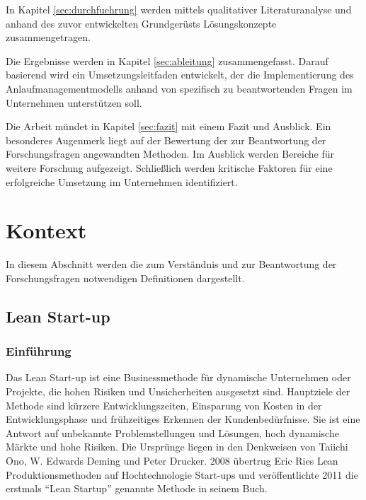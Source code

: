 In Kapitel \ref{sec:durchfuehrung} werden mittels qualitativer Literaturanalyse und anhand des zuvor entwickelten Grundgerüsts Lösungskonzepte zusammengetragen. 

Die Ergebnisse werden in Kapitel \ref{sec:ableitung} zusammengefasst. Darauf basierend wird ein Umsetzungsleitfaden entwickelt, der die Implementierung des Anlaufmanagementmodells anhand von spezifisch zu beantwortenden Fragen im Unternehmen unterstützen soll. 

Die Arbeit mündet in Kapitel \ref{sec:fazit} mit einem Fazit und Ausblick. Ein besonderes Augenmerk liegt auf der Bewertung der zur Beantwortung der Forschungsfragen angewandten Methoden. Im Ausblick werden Bereiche für weitere Forschung aufgezeigt. Schließlich werden kritische Faktoren für eine erfolgreiche Umsetzung im Unternehmen identifiziert. 

\section{Kontext}
In diesem Abschnitt werden die zum Verständnis und zur Beantwortung der Forschungsfragen notwendigen Definitionen dargestellt. 
\subsection{Lean Start-up}\label{sec:lsu}
\subsubsection*{Einführung}
Das Lean Start-up ist eine Businessmethode für dynamische Unternehmen oder Projekte, die hohen Risiken und Unsicherheiten ausgesetzt sind. 
Hauptziele der Methode sind kürzere Entwicklungszeiten, Einsparung von Kosten in der Entwicklungsphase und frühzeitiges Erkennen der Kundenbedürfnisse. 
Sie ist eine Antwort auf unbekannte Problemstellungen und Lösungen, hoch dynamische Märkte und hohe Risiken. Die Ursprünge liegen in den Denkweisen von Taiichi Ōno, W. Edwards Deming und Peter Drucker. 
2008 übertrug Eric Ries Lean Produktionsmethoden auf Hochtechnologie Start-ups und veröffentlichte 2011 die erstmals ``Lean Startup'' 
genannte Methode in seinem Buch.


